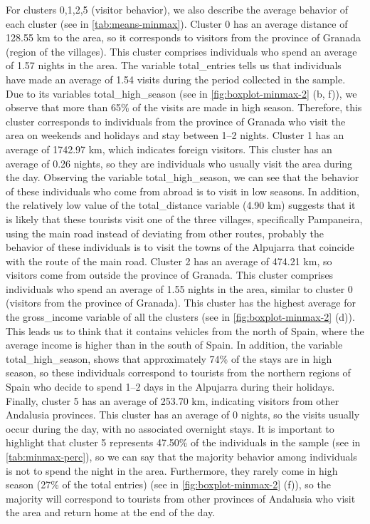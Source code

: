 For clusters 0,1,2,5 (visitor behavior), we also describe the average behavior of each cluster (see in \cref{tab:means-minmax}). Cluster 0 has an average distance of 128.55 km to the area, so it corresponds to visitors from the province of Granada (region of the villages). This cluster comprises individuals who spend an average of 1.57 nights in the area. The variable total\_entries tells us that individuals have made an average of 1.54 visits during the period collected in the sample. Due to its variables total\_high\_season (see in \cref{fig:boxplot-minmax-2} (b, f)), we observe that more than 65\% of the visits are made in high season. Therefore, this cluster corresponds to individuals from the province of Granada who visit the area on weekends and holidays and stay between 1–2 nights. Cluster 1 has an average of 1742.97 km, which indicates foreign visitors. This cluster has an average of 0.26 nights, so they are individuals who usually visit the area during the day. Observing the variable total\_high\_season, we can see that the behavior of these individuals who come from abroad is to visit in low seasons. In addition, the relatively low value of the total\_distance variable (4.90 km) suggests that it is likely that these tourists visit one of the three villages, specifically Pampaneira, using the main road instead of deviating from other routes, probably the behavior of these individuals is to visit the towns of the Alpujarra that coincide with the route of the main road. Cluster 2 has an average of 474.21 km, so visitors come from outside the province of Granada. This cluster comprises individuals who spend an average of 1.55 nights in the area, similar to cluster 0 (visitors from the province of Granada). This cluster has the highest average for the gross\_income variable of all the clusters (see in \cref{fig:boxplot-minmax-2} (d)). This leads us to think that it contains vehicles from the north of Spain, where the average income is higher than in the south of Spain. In addition, the variable total\_high\_season, shows that approximately 74\% of the stays are in high season, so these individuals correspond to tourists from the northern regions of Spain who decide to spend 1–2 days in the Alpujarra during their holidays. Finally, cluster 5 has an average of 253.70 km, indicating visitors from other Andalusia provinces. This cluster has an average of 0 nights, so the visits usually occur during the day, with no associated overnight stays. It is important to highlight that cluster 5 represents 47.50\% of the individuals in the sample (see in \cref{tab:minmax-perc}), so we can say that the majority behavior among individuals is not to spend the night in the area. Furthermore, they rarely come in high season (27\% of the total entries) (see in \cref{fig:boxplot-minmax-2} (f)), so the majority will correspond to tourists from other provinces of Andalusia who visit the area and return home at the end of the day.

